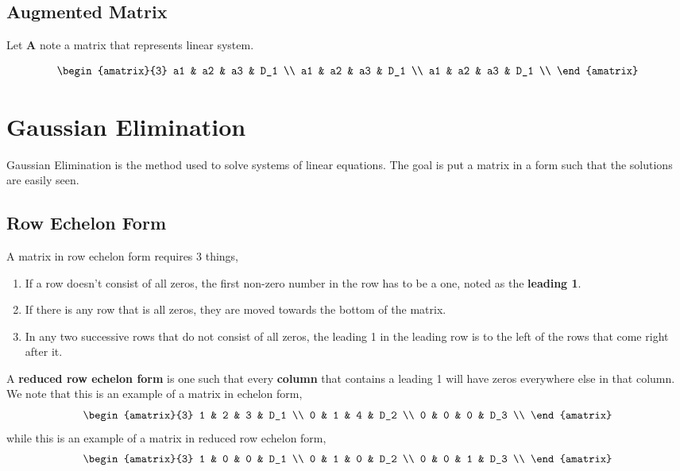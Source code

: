 \subsection{Augmented Matrix}
Let $\mathbf{A}$ note a matrix that represents linear system. 

\begin{equation*}
	\begin{amatrix}{3}
		a1 & a2 & a3 & D_1 \\ 
		a1 & a2 & a3 & D_1 \\ 
		a1 & a2 & a3 & D_1 \\ 
	\end{amatrix}
\end{equation*}

\section{Gaussian Elimination}
Gaussian Elimination is the method used to solve systems of linear equations. The goal is put a matrix in a form such that the solutions are easily seen. 

\subsection{Row Echelon Form}
A matrix in row echelon form requires 3 things, 
\begin{enumerate}
	\item If a row doesn't consist of all zeros, the first non-zero number in the row has to be a one, noted as the \textbf{leading 1}. 
	\item If there is any row that is all zeros, they are moved towards the bottom of the matrix. 
	\item In any two successive rows that do not consist of all zeros, the leading 1 in the leading row is to the left of the rows that come right after it. 
\end{enumerate}

A \textbf{reduced row echelon form} is one such that every \textbf{column} that contains a leading 1 will have zeros everywhere else in that column. We note that this is an example of a matrix in echelon form, 
\begin{equation*}
	\begin{amatrix}{3}
		1 & 2 & 3 & D_1 \\ 
		0 & 1 & 4 & D_2 \\ 
		0 & 0 & 0 & D_3 \\ 
	\end{amatrix}
\end{equation*}
while this is an example of a matrix in reduced row echelon form, 
\begin{equation*}
	\begin{amatrix}{3}
		1 & 0 & 0 & D_1 \\ 
		0 & 1 & 0 & D_2 \\ 
		0 & 0 & 1 & D_3 \\ 
	\end{amatrix}
\end{equation*}

